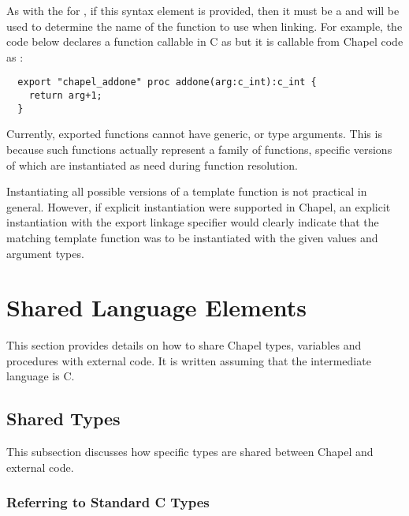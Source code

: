 As with the  for  , if this
syntax element is provided, then it must be a  
and will be used to determine the name of the function to use when
linking. For example, the code below declares a function callable in C as
 but it is callable from Chapel code as
:

\begin{chapel}
\begin{verbatim}
  export "chapel_addone" proc addone(arg:c_int):c_int {
    return arg+1;
  }
\end{verbatim}
\end{chapel}

\begin{future}
Currently, exported functions cannot have generic,  or type arguments.
This is because such functions actually represent a family of functions,
specific versions of which are instantiated as need during function resolution.

Instantiating all possible versions of a template function is not
practical in general.  However, if explicit instantiation were supported in
Chapel, an explicit instantiation with the export linkage specifier would
clearly indicate that the matching template function was to be instantiated with
the given  values and argument types.
\end{future}

\section{Shared Language Elements}
\label{Shared_Language_Elements}

This section provides details on how to share Chapel types, variables and
procedures with external code.  It is written assuming that the intermediate
language is C.

\subsection{Shared Types}

This subsection discusses how specific types are shared between Chapel and
external code.

\subsubsection{Referring to Standard C Types}
\label{Referring_to_Standard_C_Types}

